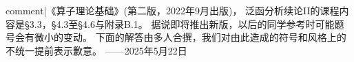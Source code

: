 \newcommand{\hol}{\mathrm{Hol}}
\newcommand{\Ran}{\operatorname{Ran}}
\newcommand{\con}{\operatorname{con}}
\newcommand{\A}{\mathcal{A}}
\newcommand{\B}{\mathcal{B}}
\newcommand{\C}{\mathbb{C}}
\newcommand{\F}{\mathcal{F}}
\renewcommand{\P}{\mathcal{P}}
\newcommand{\T}{\mathbb{T}}
\newcommand{\sigmap}{\sigma_{p}}

{{comment|《算子理论基础》(第二版，2022年9月出版)，
泛函分析续论II的课程内容是\S3.3，\S4.3至\S4.6与附录B.1。
据说即将推出新版，以后的同学参考时可能题号会有微小的变动。
下面的解答由多人合撰，我们对由此造成的符号和风格上的不统一提前表示歉意。
------2025年5月22日}}

\setcounter{section}{2}
\renewcommand\thesection{3.\arabic{section}}

